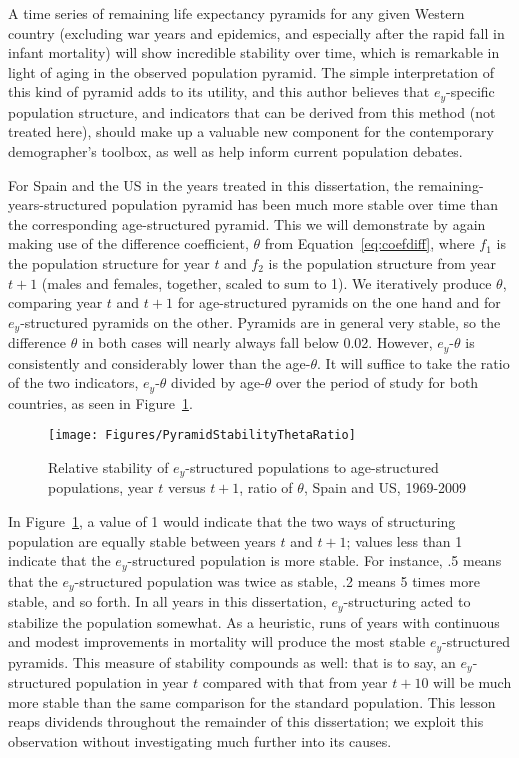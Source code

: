 A time series of remaining life expectancy pyramids for any given Western 
country (excluding war years and epidemics, and especially after the rapid fall
in infant mortality) will show incredible stability over time, which is
remarkable in light of aging in the observed population pyramid. The simple 
interpretation of this kind of pyramid adds to its utility, and this author 
believes that $e_y$-specific population structure, and
indicators that can be derived from this method (not treated here), should 
make up a valuable new component for the contemporary demographer's toolbox, as
well as help inform current population debates. 

For Spain and the US in the years treated in this dissertation,
the remaining-years-structured population pyramid has been much more
stable over time than the corresponding age-structured pyramid. This we will
demonstrate by again making use of the difference coefficient, $\theta$ from
Equation~\eqref{eq:coefdiff}, where $f_1$ is the population structure for year
$t$ and $f_2$ is the population structure from year $t+1$ (males and females, together, scaled to sum to 1). We iteratively
produce $\theta$, comparing year $t$ and $t+1$ for age-structured pyramids on
the one hand and for $e_y$-structured pyramids on the other. Pyramids are in
general very stable, so the difference $\theta$ in both cases will nearly always
fall below 0.02. However, $e_y$-$\theta$ is consistently and considerably lower
than the age-$\theta$. It will suffice to take the ratio of the two indicators,
 $e_y$-$\theta$ divided by age-$\theta$ over the period of study for both
 countries, as seen in Figure~\ref{fig:PyramidStability}.

\begin{figure}
      \centering
      \caption{Relative stability of $e_y$-structured populations to
                age-structured populations, year $t$ versus $t+1$, ratio of
                $\theta$, Spain and US, 1969-2009} 
         \texttt{[image: Figures/PyramidStabilityThetaRatio]}
      \label{fig:PyramidStability} 
\end{figure}

In Figure~\ref{fig:PyramidStability}, a value of 1 would indicate that the two
ways of structuring population are equally stable between years $t$ and $t+1$;
values less than 1 indicate that the $e_y$-structured population is more stable.
For instance, .5 means that the $e_y$-structured population was twice as stable,
.2 means 5 times more stable, and so forth. In all years in this dissertation,
$e_y$-structuring acted to stabilize the population somewhat. As a heuristic,
runs of years with continuous and modest improvements in mortality will produce
the most stable $e_y$-structured pyramids. This measure of stability compounds
as well: that is to say, an $e_y$-structured population in year $t$
compared with that from year $t+10$ will be much more stable than the same
comparison for the standard population. This lesson reaps dividends
throughout the remainder of this dissertation; we exploit this observation
without investigating much further into its causes.

